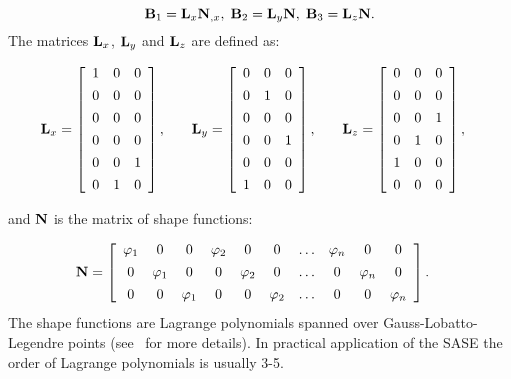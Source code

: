 \begin{equation}
	 \mathbf{B}_1= \mathbf{L}_x \mathbf{N}_{,x},\; \mathbf{B}_2= \mathbf{L}_y \mathbf{N},\; \mathbf{B}_3= \mathbf{L}_z \mathbf{N}.
	 \end{equation}
	 The matrices \( \mathbf{L}_x \),  \( \mathbf{L}_y \) and  \( \mathbf{L}_z \) are defined as:
	 
\begin{equation}
	 \begin{split}
		 & \mathbf{L}_x = \left[\begin{array}{ccc} 
		 1 & 0 & 0  \\[4pt]
		 0&0&0\\[4pt]
		 0 &0&0  \\[4pt]
		 0&0&0\\[4pt]
		 0&0&1\\[4pt]
		  0&1&0 
		 \end{array} \right], 
	 \end{split} \quad 
	  \begin{split}
		  & \mathbf{L}_y = \left[\begin{array}{ccc} 
		 0&0&0\\[4pt]
		 0&1&0\\[4pt]
		 0 &0&0\\[4pt]
		 0&0&1\\[4pt]
		 0&0&0\\[4pt]
		 1&0&0 
		 \end{array} \right],
	 \end{split} \quad 
	 \begin{split}
	& \mathbf{L}_z = \left[\begin{array}{ccc} 
	0&0&0\\[4pt]
	0&0&0\\[4pt]
	0 &0&1\\[4pt]
	0&1&0\\[4pt]
	1&0&0\\[4pt]
	0&0&0 
	\end{array} \right],
	\end{split}
	\label{eq:selectors}\end{equation}

	 and \(\mathbf{N}\) is the matrix of shape functions:
	  
\begin{equation}
	 \begin{split}
	 & \mathbf{N} = \left[\begin{array}{cccccccccc} 
	 \varphi_1 & 0 & 0  & \varphi_2 & 0 & 0& \ldots & \varphi_n & 0 & 0\\[4pt]
	 0&\varphi_1&0 &  0&\varphi_2&0 & \ldots&  0&\varphi_n&0\\[4pt]
	 0 &0&\varphi_1 & 0 &0&\varphi_2 & \ldots& 0 &0&\varphi_n 
	 \end{array} \right]. 
	 \end{split}
	 \end{equation}
The shape functions are Lagrange polynomials spanned over Gauss-Lobatto-Legendre points (see~\cite{Kudela2007} for more details). 
In  practical application of the SASE   the order of Lagrange polynomials is usually 3-5.
	 

